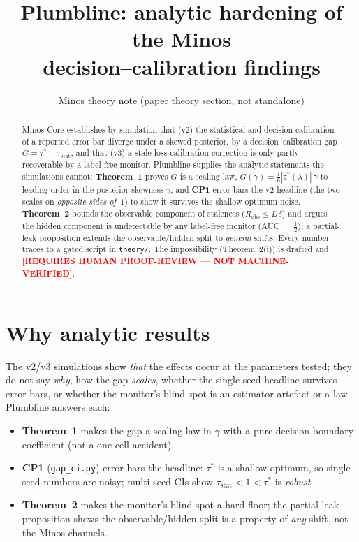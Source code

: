 \documentclass[11pt]{article}
\title{\textbf{Plumbline:} analytic hardening of the Minos\\ decision--calibration findings}
\author{Minos theory note (paper theory section, not standalone)}
\date{}
\theoremstyle{plain}
\theoremstyle{definition}
\newcommand{\taustat}{\tau_{\mathrm{stat}}}
\newcommand{\taustar}{\tau^{*}}
\newcommand{\Robs}{R_{\mathrm{obs}}}
\newcommand{\humanflag}{\textcolor{red}{\textbf{[REQUIRES HUMAN PROOF-REVIEW — NOT MACHINE-VERIFIED]}}}
\begin{document}
\maketitle

\begin{abstract}
\noindent
Minos-Core establishes by simulation that (v2) the statistical and decision calibration of a reported
error bar diverge under a skewed posterior, by a decision--calibration gap $G=\taustar-\taustat$, and
that (v3) a stale loss-calibration correction is only partly recoverable by a label-free monitor.
Plumbline supplies the analytic statements the simulations cannot: \textbf{Theorem~1} proves $G$ is a
scaling law, $G(\gamma)=\tfrac16|z^*(\lambda)|\,\gamma$ to leading order in the posterior skewness
$\gamma$, and \textbf{CP1} error-bars the v2 headline (the two scales on \emph{opposite sides of}~$1$)
to show it survives the shallow-optimum noise. \textbf{Theorem~2} bounds the observable component of
staleness ($\Robs\le L\,\delta$) and argues the hidden component is undetectable by any label-free
monitor (AUC $=\tfrac12$); a partial-leak proposition extends the observable/hidden split to
\emph{general} shifts. Every number traces to a gated script in \texttt{theory/}. The impossibility
(Theorem~2(i)) is drafted and \humanflag.
\end{abstract}

\section{Why analytic results}
The v2/v3 simulations show \emph{that} the effects occur at the parameters tested; they do not say
\emph{why}, how the gap \emph{scales}, whether the single-seed headline survives error bars, or whether
the monitor's blind spot is an estimator artefact or a law. Plumbline answers each:
\begin{itemize}[noitemsep]
  \item \textbf{Theorem~1} makes the gap a scaling law in $\gamma$ with a pure decision-boundary
        coefficient (not a one-cell accident).
  \item \textbf{CP1} (\texttt{gap\_ci.py}) error-bars the headline: $\taustar$ is a shallow optimum, so
        single-seed numbers are noisy; multi-seed CIs show $\taustat<1<\taustar$ is \emph{robust}.
  \item \textbf{Theorem~2} makes the monitor's blind spot a hard floor; the partial-leak proposition
        shows the observable/hidden split is a property of \emph{any} shift, not the Minos channels.
\end{itemize}
\end{document}
